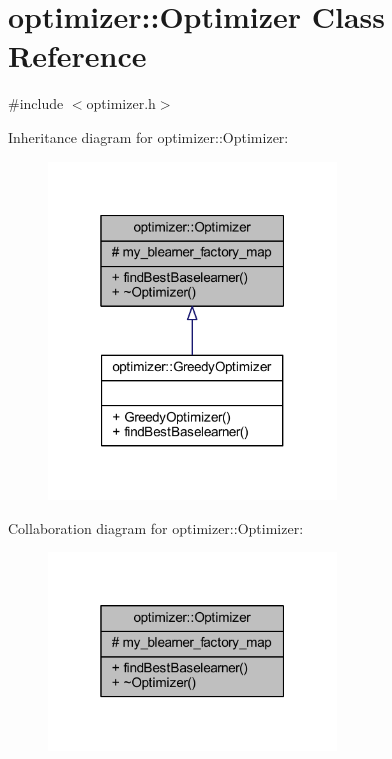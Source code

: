 \hypertarget{classoptimizer_1_1_optimizer}{}\section{optimizer\+:\+:Optimizer Class Reference}
\label{classoptimizer_1_1_optimizer}


{\ttfamily \#include $<$optimizer.\+h$>$}



Inheritance diagram for optimizer\+:\+:Optimizer\+:\nopagebreak
\begin{figure}[H]
\begin{center}
\leavevmode
\includegraphics[width=217pt]{classoptimizer_1_1_optimizer__inherit__graph}
\end{center}
\end{figure}


Collaboration diagram for optimizer\+:\+:Optimizer\+:\nopagebreak
\begin{figure}[H]
\begin{center}
\leavevmode
\includegraphics[width=217pt]{classoptimizer_1_1_optimizer__coll__graph}
\end{center}
\end{figure}
